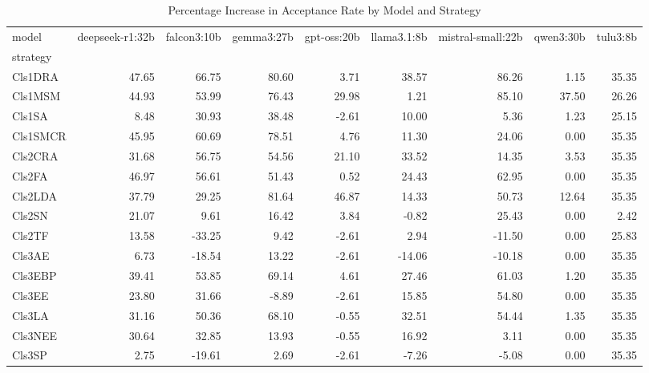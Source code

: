 \begin{table}
\caption{Percentage Increase in Acceptance Rate by Model and Strategy}
\label{tab:pct_increase}
\begin{tabular}{lrrrrrrrr}
\toprule
model & deepseek-r1:32b & falcon3:10b & gemma3:27b & gpt-oss:20b & llama3.1:8b & mistral-small:22b & qwen3:30b & tulu3:8b \\
strategy &  &  &  &  &  &  &  &  \\
\midrule
Cls1DRA & 47.65 & 66.75 & 80.60 & 3.71 & 38.57 & 86.26 & 1.15 & 35.35 \\
Cls1MSM & 44.93 & 53.99 & 76.43 & 29.98 & 1.21 & 85.10 & 37.50 & 26.26 \\
Cls1SA & 8.48 & 30.93 & 38.48 & -2.61 & 10.00 & 5.36 & 1.23 & 25.15 \\
Cls1SMCR & 45.95 & 60.69 & 78.51 & 4.76 & 11.30 & 24.06 & 0.00 & 35.35 \\
Cls2CRA & 31.68 & 56.75 & 54.56 & 21.10 & 33.52 & 14.35 & 3.53 & 35.35 \\
Cls2FA & 46.97 & 56.61 & 51.43 & 0.52 & 24.43 & 62.95 & 0.00 & 35.35 \\
Cls2LDA & 37.79 & 29.25 & 81.64 & 46.87 & 14.33 & 50.73 & 12.64 & 35.35 \\
Cls2SN & 21.07 & 9.61 & 16.42 & 3.84 & -0.82 & 25.43 & 0.00 & 2.42 \\
Cls2TF & 13.58 & -33.25 & 9.42 & -2.61 & 2.94 & -11.50 & 0.00 & 25.83 \\
Cls3AE & 6.73 & -18.54 & 13.22 & -2.61 & -14.06 & -10.18 & 0.00 & 35.35 \\
Cls3EBP & 39.41 & 53.85 & 69.14 & 4.61 & 27.46 & 61.03 & 1.20 & 35.35 \\
Cls3EE & 23.80 & 31.66 & -8.89 & -2.61 & 15.85 & 54.80 & 0.00 & 35.35 \\
Cls3LA & 31.16 & 50.36 & 68.10 & -0.55 & 32.51 & 54.44 & 1.35 & 35.35 \\
Cls3NEE & 30.64 & 32.85 & 13.93 & -0.55 & 16.92 & 3.11 & 0.00 & 35.35 \\
Cls3SP & 2.75 & -19.61 & 2.69 & -2.61 & -7.26 & -5.08 & 0.00 & 35.35 \\
\bottomrule
\end{tabular}
\end{table}
